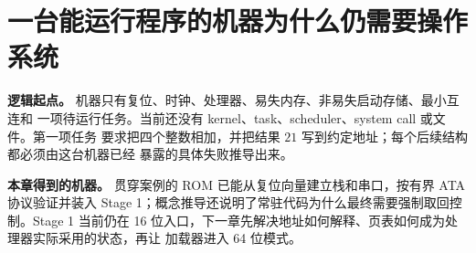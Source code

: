 \chapter{一台能运行程序的机器为什么仍需要操作系统}

\begin{statebox}
\textbf{逻辑起点。} 机器只有复位、时钟、处理器、易失内存、非易失启动存储、最小互连和
一项待运行任务。当前还没有 kernel、task、scheduler、system call 或文件。第一项任务
要求把四个整数相加，并把结果 \(21\) 写到约定地址；每个后续结构都必须由这台机器已经
暴露的具体失败推导出来。
\end{statebox}


\begin{problemframe}
\textbf{本章得到的机器。} 贯穿案例的 ROM 已能从复位向量建立栈和串口，按有界 ATA
协议验证并装入 Stage 1；概念推导还说明了常驻代码为什么最终需要强制取回控制。Stage 1
当前仍在 16 位入口，下一章先解决地址如何解释、页表如何成为处理器实际采用的状态，再让
加载器进入 64 位模式。
\end{problemframe}
